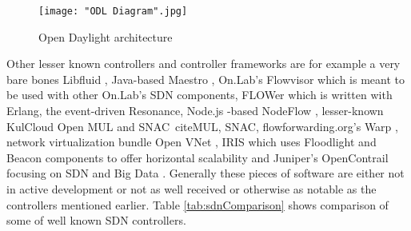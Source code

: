 \begin{figure}[h!t]
\centering
{}
\texttt{[image: "ODL Diagram".jpg]}
\caption{Open Daylight architecture}
\label{fig:ODL}
\end{figure}

Other lesser known controllers and controller frameworks are for example a very bare bones Libfluid \cite{Libfluid}, Java-based Maestro \cite{Maestro}, On.Lab’s Flowvisor \cite{FlowVisor} which is meant to be used with other On.Lab’s SDN components, FLOWer \cite{Flower} which is written with Erlang, the event-driven Resonance\cite{Resonance}, Node.js -based NodeFlow \cite{Nodeflow}, lesser-known KulCloud Open MUL and SNAC\ cite{MUL, SNAC}, flowforwarding.org’s Warp \cite{Warp}, network virtualization bundle Open VNet \cite{VNet}, IRIS which uses Floodlight and Beacon components to offer horizontal scalability \cite{IRIS} and Juniper’s OpenContrail focusing on SDN and Big Data \cite{Contrail}. Generally these pieces of software are either not in active development or not as well received or otherwise as notable as the controllers mentioned earlier. Table \ref{tab:sdnComparison} shows comparison of some of well known SDN controllers.  

